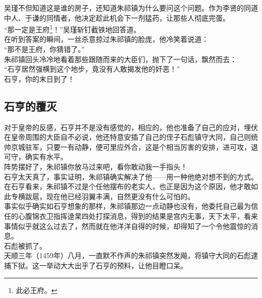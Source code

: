 \begin{multicols}{\theparacolNo}
吴瑾不但知道这是谁的房子，还知道朱祁镇为什么要问这个问题。作为李贤的同道中人、于谦的同情者，他决定趁此机会下一剂猛药，让那些人彻底完蛋。\\

“那一定是王府\footnote{此必王府。}！”吴瑾斩钉截铁地回答道。\\

在听到答案的瞬间，一丝杀意掠过朱祁镇的脸庞，他冷笑着说道：\\

“那不是王府，你猜错了。”\\

朱祁镇回头冷冷地看着那些跟随而来的大臣们，抛下了一句话，飘然而去：\\

“石亨居然强横到这个地步，竟没有人敢揭发他的奸恶！”\\

石亨，你的末日到了！\\

\subsection{石亨的覆灭}
对于皇帝的反感，石亨并不是没有感觉的，相应的，他也准备了自己的应对，埋伏在皇帝周围的大臣自不必说，他还特意安插了自己的侄子石彪镇守大同，自己则统帅京城驻军，只要一有动静，便可里应外合，这是个相当厉害的安排，进可攻，退可守，确实有水平。\\

阵势摆好了，朱祁镇你放马过来吧，看你敢动我一手指头！\\

石亨太天真了，事实证明，朱祁镇确实解决了他——用一种他绝对想不到的方式。\\

在石亨看来，朱祁镇不过是个任他摆布的老实人，也正是因为这个原因，他才敢如此专横跋扈，现在他已经羽翼丰满，自然更没有什么可怕的。\\

事实似乎确实如石亨想象的那样，朱祁镇那边一点动静也没有，他委托自己最为信任的心腹锦衣卫指挥逯杲四处打探消息，得到的结果是宫内无事，天下太平，看来事情似乎就这么过去了，然而就在他洋洋自得的时候，却得知了一个令他震惊的消息。\\

石彪被抓了。\\

天顺三年（1459年）八月，一直默不作声的朱祁镇突然发飚，将镇守大同的石彪逮捕下狱。这一举动大大出乎了石亨的预料，让他目瞪口呆。\\


\end{multicols}
